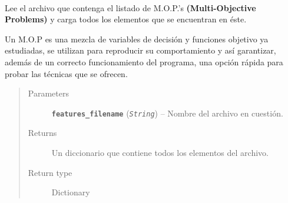 \documentclass[letterpaper,10pt,english]{sphinxmanual}
\begin{document}
\begin{fulllineitems}
\begin{fulllineitems}
\label{Controller/XMLParser:Controller.XMLParser.XMLParser.load_xml_mop_examples}~
\begin{DUlineblock}{0em}
\item[] Lee el archivo que contenga el listado de M.O.P.'s \textbf{(Multi-Objective Problems)}
y carga todos los elementos que se encuentran en éste.
\item[] 
\item[] Un M.O.P es una mezcla de variables de decisión y funciones objetivo ya estudiadas,
se utilizan para reproducir su comportamiento y así garantizar, además de un correcto
funcionamiento del programa, una opción rápida para probar las técnicas que se ofrecen.
\end{DUlineblock}
\begin{quote}\begin{description}
\item[{Parameters}] \leavevmode
\textbf{\texttt{features\_filename}} (\emph{\texttt{String}}) -- Nombre del archivo en cuestión.

\item[{Returns}] \leavevmode
Un diccionario que contiene todos los elementos
del archivo.

\item[{Return type}] \leavevmode
Dictionary

\end{description}\end{quote}

\end{fulllineitems}



\end{fulllineitems}
\end{document}
